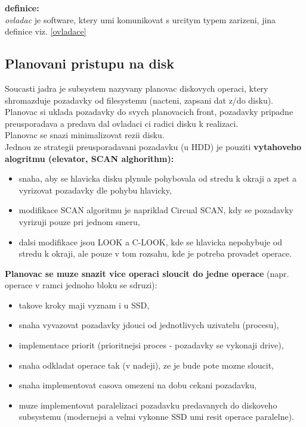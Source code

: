 \documentclass[a4paper, 11pt]{article}
\begin{document}
\noindent\textbf{definice:} \\[0.5em] \label{ovladac}
\textit{ovladac} je software, ktery umi komunikovat s urcitym typem zarizeni, jina definice viz. \ref{ovladace}

\subsection{Planovani pristupu na disk}
Soucasti jadra je subsystem nazyvany planovac diskovych operaci, ktery shromazduje pozadavky od filesystemu (nacteni, zapsani dat z/do disku). Planovac si uklada pozadavky do svych planovacich front, pozadavky pripadne preusporadava a predava dal ovladaci ci radici disku k realizaci. \\

\noindent Planovac se snazi minimalizovat rezii disku. \\

\noindent Jednou ze strategii preusporadavani pozadavku (u HDD) je pouziti \textbf{vytahoveho alogritmu (elevator, SCAN alghorithm):}
\begin{itemize}
    \item snaha, aby se hlavicka disku plynule pohybovala od stredu k okraji a zpet a vyrizovat pozadavky dle pohybu hlavicky,
    \item modifikace SCAN algoritmu je napriklad Circual SCAN, kdy se pozadavky vyrizuji pouze pri jednom smeru,
    \item dalsi modifikace jsou LOOK a C-LOOK, kde se hlavicka nepohybuje od stredu k okraji, ale pouze v tom rozsahu, kde je potreba provadet operace. \\
\end{itemize}

\noindent\textbf{Planovac se muze snazit vice operaci sloucit do jedne operace} (napr. operace v ramci jednoho bloku se sdruzi):
\begin{itemize}
    \item takove kroky maji vyznam i u SSD,
    \item snaha vyvazovat pozadavky jdouci od jednotlivych uzivatelu (procesu),
    \item implementace priorit (prioritnejsi proces - pozadavky se vykonaji drive),
    \item snaha odkladat operace tak (v nadeji), ze je bude pote mozne sloucit,
    \item snaha implementovat casova omezeni na dobu cekani pozadavku,
    \item muze implementovat paralelizaci pozadavku predavanych do diskoveho subsystemu (modernejsi a velmi vykonne SSD umi resit operace  paralelne). \\
\end{itemize}
\end{document}
